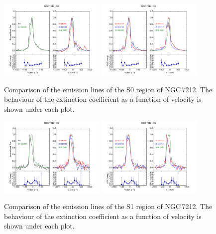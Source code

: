 \documentclass[../thesis.tex]{subfiles}
\begin{document}
\begin{figure}
\centering
\includegraphics[width=0.45\textwidth]{images/paper1/NGC7212_s0_l1.pdf} \quad
\includegraphics[width=0.45\textwidth]{images/paper1/NGC7212_s0_l2.pdf}\\
\caption[]{Comparison of the emission lines of the S0 region of NGC\,7212. The behaviour of the extinction coefficient as a function of velocity is shown under each plot.}
\label{fig:s0l1_N}
\end{figure}

\begin{figure}
\centering
\includegraphics[width=0.45\textwidth]{images/paper1/NGC7212_s1_l1.pdf} \quad
\includegraphics[width=0.45\textwidth]{images/paper1/NGC7212_s1_l2.pdf}\\
\caption[]{Comparison of the emission lines of the S1 region of NGC\,7212. The behaviour of the extinction coefficient as a function of velocity is shown under each plot.}
\label{fig:s1l1_N}
\end{figure}
\end{document}
